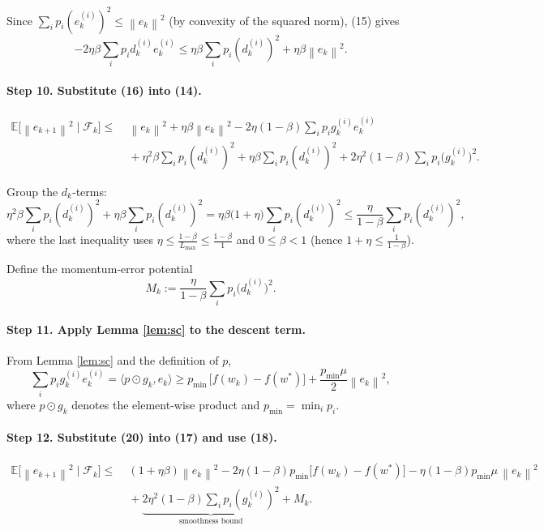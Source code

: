 \documentclass{article}
\newcommand{\E}{\mathbb{E}}
\newcommand{\norm}[1]{\left\|#1\right\|}
\newcommand{\ip}[2]{\langle #1,#2\rangle}
\begin{document}
Since $\sum_i p_i(e_k^{(i)})^{2}\le \norm{e_k}^{2}$ (by convexity of the squared norm), (15) gives
\[
-2\eta\beta\sum_{i}p_i d_k^{(i)}e_k^{(i)}
\le \eta\beta\sum_{i}p_i(d_k^{(i)})^{2}+\eta\beta \norm{e_k}^{2}.
\tag{16}
\]

\paragraph{Step 10. Substitute (16) into (14).}
\[
\begin{aligned}
\E\!\bigl[\norm{e_{k+1}}^{2}\mid\mathcal{F}_k\bigr]
\le&\;\norm{e_k}^{2}
+\eta\beta\norm{e_k}^{2}
-2\eta(1-\beta)\sum_{i}p_i g_k^{(i)}e_k^{(i)}\\
&\;+\eta^{2}\beta\sum_{i}p_i(d_k^{(i)})^{2}
+\eta\beta\sum_{i}p_i(d_k^{(i)})^{2}
+2\eta^{2}(1-\beta)\sum_{i}p_i\bigl(g_k^{(i)}\bigr)^{2}.
\end{aligned}
\tag{17}
\]

Group the $d_k$‑terms:
\[
\eta^{2}\beta\sum_{i}p_i(d_k^{(i)})^{2}+\eta\beta\sum_{i}p_i(d_k^{(i)})^{2}
= \eta\beta\bigl(1+\eta\bigr)\sum_{i}p_i(d_k^{(i)})^{2}
\le \frac{\eta}{1-\beta}\sum_{i}p_i(d_k^{(i)})^{2},
\tag{18}
\]
where the last inequality uses $\eta\le\frac{1-\beta}{L_{\max}}\le\frac{1-\beta}{1}$ and $0\le\beta<1$ (hence $1+\eta\le\frac{1}{1-\beta}$).

Define the momentum‑error potential
\[
M_k:=\frac{\eta}{1-\beta}\sum_{i}p_i\bigl(d_k^{(i)}\bigr)^{2}.
\tag{19}
\]

\paragraph{Step 11. Apply Lemma \ref{lem:sc} to the descent term.}
From Lemma \ref{lem:sc} and the definition of $p$,
\[
\sum_{i}p_i g_k^{(i)}e_k^{(i)}=\ip{p\odot g_k}{e_k}
\ge p_{\min}\,\bigl[f(w_k)-f(w^*)\bigr]+\frac{p_{\min}\mu}{2}\norm{e_k}^{2},
\tag{20}
\]
where $p\odot g_k$ denotes the element‑wise product and $p_{\min}=\min_i p_i$.

\paragraph{Step 12. Substitute (20) into (17) and use (18).}
\[
\begin{aligned}
\E\!\bigl[\norm{e_{k+1}}^{2}\mid\mathcal{F}_k\bigr]
\le&\;(1+\eta\beta)\norm{e_k}^{2}
-2\eta(1-\beta)p_{\min}\bigl[f(w_k)-f(w^*)\bigr]
-\eta(1-\beta)p_{\min}\mu\,\norm{e_k}^{2}\\
&\;+\underbrace{2\eta^{2}(1-\beta)\sum_{i}p_i(g_k^{(i)})^{2}}_{\text{smoothness bound}}
+M_k .
\end{aligned}
\tag{21}
\]
\end{document}
